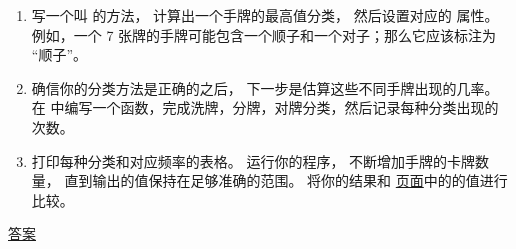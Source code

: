 \begin{exercise}
\begin{enumerate}
\item 写一个叫  的方法， 计算出一个手牌的最高值分类， 然后设置对应的  属性。  例如，一个 7 张牌的手牌可能包含一个顺子和一个对子；那么它应该标注为 ``顺子''。


\item 确信你的分类方法是正确的之后， 下一步是估算这些不同手牌出现的几率。  在  中编写一个函数，完成洗牌，分牌，对牌分类，然后记录每种分类出现的次数。


\item 打印每种分类和对应频率的表格。  运行你的程序， 不断增加手牌的卡牌数量， 直到输出的值保持在足够准确的范围。  将你的结果和 \href{http://en.wikipedia.org/wiki/Hand_rankings}{页面}中的的值进行比较。


\end{enumerate}


\href{http://thinkpython2.com/code/PokerHandSoln.py}{答案}

\end{exercise}